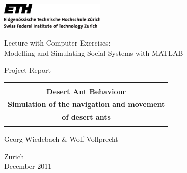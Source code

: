 
\thispagestyle{empty}

\begin{center}
\includegraphics[width=5cm]{images/ETHlogo.eps}

\bigskip


\bigskip


\bigskip


\LARGE{ Lecture with Computer Exercises:\\ }
\LARGE{ Modelling and Simulating Social Systems with MATLAB\\}

\bigskip

\bigskip

\small{Project Report}\\

\bigskip

\bigskip

\bigskip

\bigskip


\begin{tabular}{|c|}
\hline
\\
\textbf{\LARGE{ Desert Ant Behaviour }}\\
\textbf{\LARGE{ Simulation of the navigation and movement}}\\
\textbf{\LARGE{ of desert ants }}\\
\\
\hline
\end{tabular}
\bigskip

\bigskip

\bigskip

\LARGE{Georg Wiedebach \& Wolf Vollprecht}



\bigskip

\bigskip

\bigskip

\bigskip

\bigskip

\bigskip

\bigskip

\bigskip

Zurich\\
December 2011\\

\end{center}


